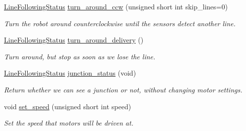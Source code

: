 \begin{DoxyCompactItemize}
\hyperlink{namespaceIDP_a5993bdfdd901fc5521c8df42dca43bd0}{LineFollowingStatus} \hyperlink{classIDP_1_1LineFollowing_a4ec0ca8ee4107b4f218f41f437d49e97}{turn\_\-around\_\-ccw} (unsigned short int skip\_\-lines=0)
\begin{DoxyCompactList}\small\item\em Turn the robot around counterclockwise until the sensors detect another line. \item\end{DoxyCompactList}\item 
\hyperlink{namespaceIDP_a5993bdfdd901fc5521c8df42dca43bd0}{LineFollowingStatus} \hyperlink{classIDP_1_1LineFollowing_aac16cbc1fe80f6f97cecf2bf51ef3bae}{turn\_\-around\_\-delivery} ()
\begin{DoxyCompactList}\small\item\em Turn around, but stop as soon as we lose the line. \item\end{DoxyCompactList}\item 
\hyperlink{namespaceIDP_a5993bdfdd901fc5521c8df42dca43bd0}{LineFollowingStatus} \hyperlink{classIDP_1_1LineFollowing_af4feccda1b15ebbdad8dd49178b28914}{junction\_\-status} (void)
\begin{DoxyCompactList}\small\item\em Return whether we can see a junction or not, without changing motor settings. \item\end{DoxyCompactList}\item 
void \hyperlink{classIDP_1_1LineFollowing_af034f457aef1716d042606c71dddfd73}{set\_\-speed} (unsigned short int speed)
\begin{DoxyCompactList}\small\item\em Set the speed that motors will be driven at. \item\end{DoxyCompactList}\end{DoxyCompactItemize}
